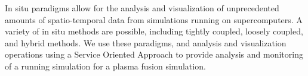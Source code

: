 \license


In situ paradigms allow for the analysis and visualization of unprecedented amounts of spatio-temporal data from simulations running on supercomputers. A variety of in situ methods are possible, including tightly coupled, loosely coupled, and hybrid methods. We use these paradigms, and analysis and visualization operations using a Service Oriented Approach to provide analysis and monitoring of a running simulation for a plasma fusion simulation.

